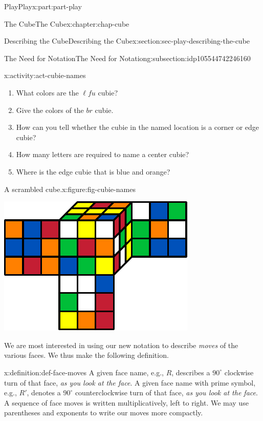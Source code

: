 \documentclass[oneside,10pt,]{book}
\numberwithin{equation}{section}
\begin{document}
\begin{partptx}{Play}{}{Play}{}{}{x:part:part-play}
\begin{chapterptx}{The Cube}{}{The Cube}{}{}{x:chapter:chap-cube}
\begin{sectionptx}{Describing the Cube}{}{Describing the Cube}{}{}{x:section:sec-play-describing-the-cube}
\begin{subsectionptx}{The Need for Notation}{}{The Need for Notation}{}{}{g:subsection:idp105544742246160}
\begin{activity}{}{x:activity:act-cubie-names}
%
\begin{enumerate}
\item{}What colors are the \(\ell f u\) cubie?%
\item{}Give the colors of the \(br\) cubie.%
\item{}How can you tell whether the cubie in the named location is a corner or edge cubie?%
\item{}How many letters are required to name a center cubie?%
\item{}Where is the edge cubie that is blue and orange?%
\end{enumerate}
\begin{figureptx}{A scrambled cube.}{x:figure:fig-cubie-names}{}%
\begin{image}{0.25}{0.5}{0.25}%
\includegraphics[width=\linewidth]{./images/cubie_names.pdf}
\end{image}%
\tcblower
\end{figureptx}%
\end{activity}%
We are most interested in using our new notation to describe \emph{moves} of the various faces. We thus make the following definition.%
\begin{definition}{}{x:definition:def-face-moves}%
%
A given face name, e.g., \(R\), describes a \(90^\circ\) clockwise turn of that face, \emph{as you look at the face}. A given face name with prime symbol, e.g., \(R'\), denotes a \(90^\circ\) counterclockwise turn of that face, \emph{as you look at the face}. A sequence of face moves is written multiplicatively, left to right. We may use parentheses and exponents to write our moves more compactly.%
\end{definition}

\end{subsectionptx}
\end{sectionptx}
\end{chapterptx}
\end{partptx}
\end{document}
